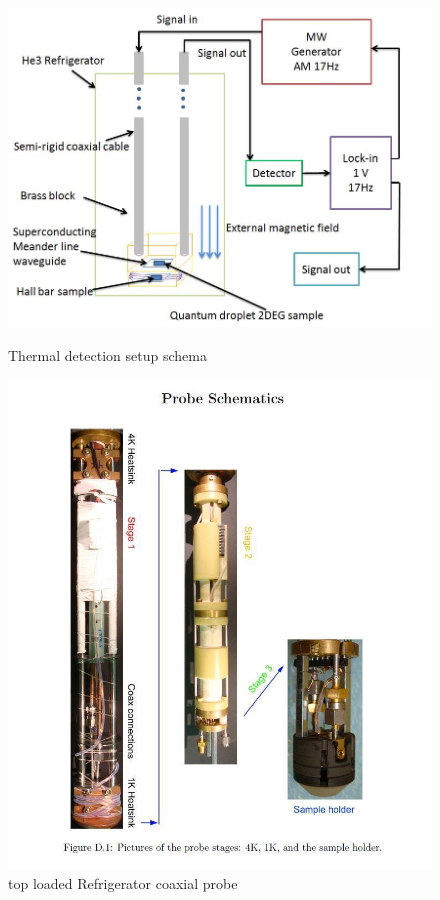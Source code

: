 \documentclass[12pt]{ruthesis}
\begin{document}
 

\begin{figure}[!htb]\centering
   \begin{minipage}{0.49\textwidth}
     \includegraphics[width=\linewidth]{figures/SCHEMA.JPG}
     \caption{Thermal detection setup schema}\label{thermal-schema}
   \end{minipage}
   \begin {minipage}{0.49\textwidth}
     \includegraphics[width=\linewidth]{figures/probe.JPG}
     \caption{ top loaded Refrigerator coaxial probe}\label{probe}
   \end{minipage}
\end{figure}
\end{document}
